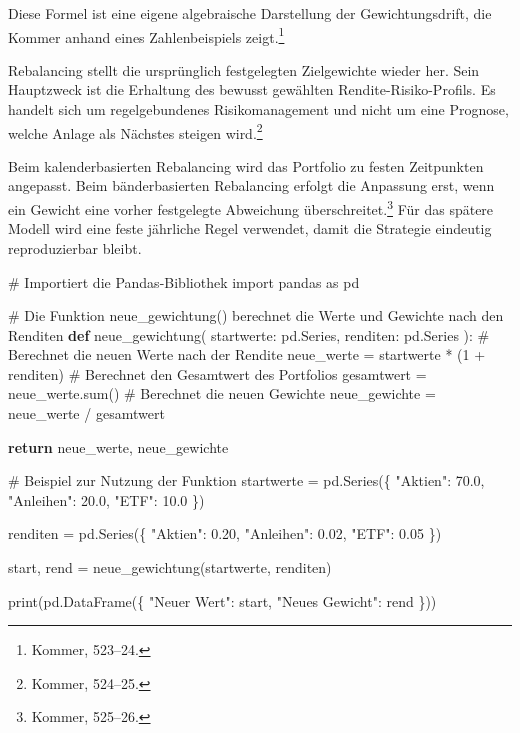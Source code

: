 \documentclass[
  ngerman,
  a4paper,
  DIV=11,
  oneside]{scrreprt}
\newenvironment{Shaded}{\begin{snugshade}}{\end{snugshade}}
\newcommand{\BuiltInTok}[1]{\textcolor[rgb]{0.00,0.23,0.31}{#1}}
\newcommand{\CommentTok}[1]{\textcolor[rgb]{0.37,0.37,0.37}{#1}}
\newcommand{\ControlFlowTok}[1]{\textcolor[rgb]{0.00,0.23,0.31}{\textbf{#1}}}
\newcommand{\DecValTok}[1]{\textcolor[rgb]{0.68,0.00,0.00}{#1}}
\newcommand{\FloatTok}[1]{\textcolor[rgb]{0.68,0.00,0.00}{#1}}
\newcommand{\ImportTok}[1]{\textcolor[rgb]{0.00,0.46,0.62}{#1}}
\newcommand{\KeywordTok}[1]{\textcolor[rgb]{0.00,0.23,0.31}{\textbf{#1}}}
\newcommand{\NormalTok}[1]{\textcolor[rgb]{0.00,0.23,0.31}{#1}}
\newcommand{\OperatorTok}[1]{\textcolor[rgb]{0.37,0.37,0.37}{#1}}
\newcommand{\StringTok}[1]{\textcolor[rgb]{0.13,0.47,0.30}{#1}}
\begin{document}
Diese Formel ist eine eigene algebraische Darstellung der
Gewichtungsdrift, die Kommer anhand eines Zahlenbeispiels
zeigt.\footnote{Kommer, 523--24.}

Rebalancing stellt die ursprünglich festgelegten Zielgewichte wieder
her. Sein Hauptzweck ist die Erhaltung des bewusst gewählten
Rendite-Risiko-Profils. Es handelt sich um regelgebundenes
Risikomanagement und nicht um eine Prognose, welche Anlage als Nächstes
steigen wird.\footnote{Kommer, 524--25.}

Beim kalenderbasierten Rebalancing wird das Portfolio zu festen
Zeitpunkten angepasst. Beim bänderbasierten Rebalancing erfolgt die
Anpassung erst, wenn ein Gewicht eine vorher festgelegte Abweichung
überschreitet.\footnote{Kommer, 525--26.} Für das spätere Modell wird
eine feste jährliche Regel verwendet, damit die Strategie eindeutig
reproduzierbar bleibt.

\begin{Shaded}
\begin{Highlighting}[]
\CommentTok{\# Importiert die Pandas{-}Bibliothek}
\ImportTok{import}\NormalTok{ pandas }\ImportTok{as}\NormalTok{ pd}


\CommentTok{\# Die Funktion neue\_gewichtung() berechnet die Werte und Gewichte nach den Renditen}
\KeywordTok{def}\NormalTok{ neue\_gewichtung(}
\NormalTok{    startwerte: pd.Series,}
\NormalTok{    renditen: pd.Series}
\NormalTok{):}
    \CommentTok{\# Berechnet die neuen Werte nach der Rendite}
\NormalTok{    neue\_werte }\OperatorTok{=}\NormalTok{ startwerte }\OperatorTok{*}\NormalTok{ (}\DecValTok{1} \OperatorTok{+}\NormalTok{ renditen)}
    \CommentTok{\# Berechnet den Gesamtwert des Portfolios}
\NormalTok{    gesamtwert }\OperatorTok{=}\NormalTok{ neue\_werte.}\BuiltInTok{sum}\NormalTok{()}
    \CommentTok{\# Berechnet die neuen Gewichte}
\NormalTok{    neue\_gewichte }\OperatorTok{=}\NormalTok{ neue\_werte }\OperatorTok{/}\NormalTok{ gesamtwert}

    \ControlFlowTok{return}\NormalTok{ neue\_werte, neue\_gewichte}


\CommentTok{\# Beispiel zur Nutzung der Funktion}
\NormalTok{startwerte }\OperatorTok{=}\NormalTok{ pd.Series(\{}
    \StringTok{"Aktien"}\NormalTok{: }\FloatTok{70.0}\NormalTok{,}
    \StringTok{"Anleihen"}\NormalTok{: }\FloatTok{20.0}\NormalTok{,}
    \StringTok{"ETF"}\NormalTok{: }\FloatTok{10.0}
\NormalTok{\})}

\NormalTok{renditen }\OperatorTok{=}\NormalTok{ pd.Series(\{}
    \StringTok{"Aktien"}\NormalTok{: }\FloatTok{0.20}\NormalTok{,}
    \StringTok{"Anleihen"}\NormalTok{: }\FloatTok{0.02}\NormalTok{,}
    \StringTok{"ETF"}\NormalTok{: }\FloatTok{0.05}
\NormalTok{\})}

\NormalTok{start, rend }\OperatorTok{=}\NormalTok{ neue\_gewichtung(startwerte, renditen)}

\BuiltInTok{print}\NormalTok{(pd.DataFrame(\{}
    \StringTok{"Neuer Wert"}\NormalTok{: start,}
    \StringTok{"Neues Gewicht"}\NormalTok{: rend}
\NormalTok{\}))}
\end{Highlighting}
\end{Shaded}
\end{document}
